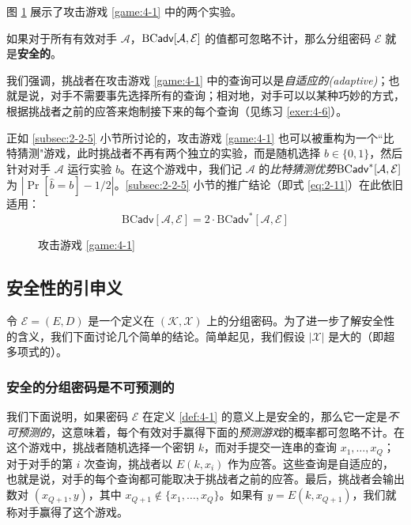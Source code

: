 图 \ref{fig:4-2} 展示了攻击游戏 \ref{game:4-1} 中的两个实验。

\begin{definition}[安全的分组密码]\label{def:4-1}
如果对于所有有效对手 $\mathcal{A}$，${\rm BC\mathsf{adv}}[\mathcal{A},\mathcal{E}]$ 的值都可忽略不计，那么分组密码 $\mathcal{E}$ 就是\textbf{安全的}。
\end{definition}

我们强调，挑战者在攻击游戏 \ref{game:4-1} 中的查询可以是\emph{自适应的(adaptive)}；也就是说，对手不需要事先选择所有的查询；相对地，对手可以以某种巧妙的方式，根据挑战者之前的应答来炮制接下来的每个查询（见练习 \ref{exer:4-6}）。

正如 \ref{subsec:2-2-5} 小节所讨论的，攻击游戏 \ref{game:4-1} 也可以被重构为一个``比特猜测"游戏，此时挑战者不再有两个独立的实验，而是随机选择 $b\in\{0,1\}$，然后针对对手 $\mathcal{A}$ 运行实验 $b$。在这个游戏中，我们记 $\mathcal{A}$ 的\emph{比特猜测优势}${\rm BC\mathsf{adv}}^*[\mathcal{A},\mathcal{E}]$ 为 $|\Pr[\hat b = b]-{1}/{2}|$。\ref{subsec:2-2-5} 小节的推广结论（即式 \ref{eq:2-11}）在此依旧适用：
\begin{equation}
\mathrm{BC}\mathsf{adv}[\mathcal{A},\mathcal{E}]
=2\cdot
\mathrm{BC}\mathsf{adv}^*[\mathcal{A},\mathcal{E}]
\end{equation}

\begin{figure}
  \centering
    
  \caption{攻击游戏 \ref{game:4-1}}
  \label{fig:4-2}
\end{figure}

\subsection{安全性的引申义}\label{subsec:4-1-1}

令 $\mathcal{E}=(E,D)$ 是一个定义在 $(\mathcal{K},\mathcal{X})$ 上的分组密码。为了进一步了解安全性的含义，我们下面讨论几个简单的结论。简单起见，我们假设 $|\mathcal{X}|$ 是大的（即超多项式的）。

\subsubsection{安全的分组密码是不可预测的}\label{subsubsec:4-1-1-1}

我们下面说明，如果密码 $\mathcal{E}$ 在定义 \ref{def:4-1} 的意义上是安全的，那么它一定是\emph{不可预测的}，这意味着，每个有效对手赢得下面的\emph{预测游戏}的概率都可忽略不计。在这个游戏中，挑战者随机选择一个密钥 $k$，而对手提交一连串的查询 $x_1,\dots,x_Q$；对于对手的第 $i$ 次查询，挑战者以 $E(k,x_i)$ 作为应答。这些查询是自适应的，也就是说，对手的每个查询都可能取决于挑战者之前的应答。最后，挑战者会输出数对 $(x_{Q+1},y)$，其中 $x_{Q+1}\notin\{x_1,\dots,x_Q\}$。如果有 $y=E(k,x_{Q+1})$，我们就称对手赢得了这个游戏。

